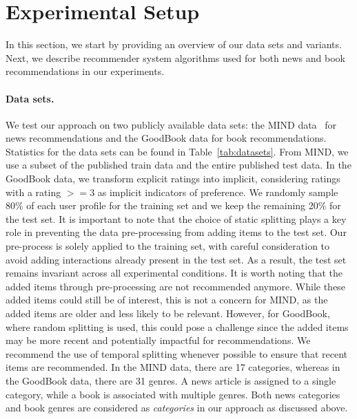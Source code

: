 \documentclass[runningheads]{llncs}
\begin{document}
\section{Experimental Setup}
In this section, we start by providing an overview of our data sets and variants. 
Next, we describe recommender system algorithms used for both news and book recommendations in our experiments.

\paragraph{Data sets.}
We test our approach on two publicly available data sets: the MIND data~\cite{wu2020mind} for news recommendations and the GoodBook data for book recommendations. 
Statistics for the data sets can be found in Table~\ref{tab:datasets}. 
From MIND, we use a subset of the published train data and the entire published test data. 
In the GoodBook data, we transform explicit ratings into implicit, considering ratings with a rating $>= 3$ as implicit indicators of preference. 
We randomly sample 80\% of each user profile for the training set and we keep the remaining 20\% for the test set.
It is important to note that the choice of static splitting plays a key role in preventing the data pre-processing from adding items to the test set. 
Our pre-process is solely applied to the training set, with careful consideration to avoid adding interactions already present in the test set. 
As a result, the test set remains invariant across all experimental conditions. 
It is worth noting that the added items through pre-processing are not recommended anymore. 
While these added items could still be of interest, this is not a concern for MIND, as the added items are older and less likely to be relevant. 
However, for GoodBook, where random splitting is used, this could pose a challenge since the added items may be more recent and potentially impactful for recommendations. 
We recommend the use of temporal splitting whenever possible to ensure that recent items are recommended.
In the MIND data, there are 17 categories, whereas in the GoodBook data, there are 31 genres. 
A news article is assigned to a single category, while a book is associated with multiple genres. 
Both news categories and book genres are considered as \textit{categories} in our approach as discussed above. 
\end{document}
